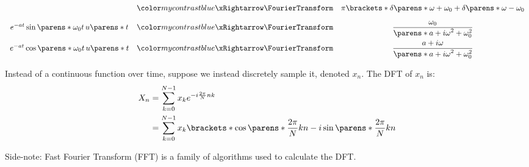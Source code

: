 \begin{multicols}{2}
\begin{CheatsheetEntryFrame}
\begin{equation*}
\begin{array}{ccc}
                &\TmpFTArrow&
                \pi \brackets*{
                    \delta\parens*{\omega + \omega_0}
                    + \delta\parens*{\omega - \omega_0}
                }
                \\[1em]
                e^{-a t} \sin\parens*{\omega_0 t} \, u\parens*{t}
                &\TmpFTArrow&
                \displaystyle
                \frac{\omega_0}{\parens*{a + i \omega}^2 + \omega_0^2}
                \\[1em]
                e^{-a t} \cos\parens*{\omega_0 t} \, u\parens*{t}
                &\TmpFTArrow&
                \displaystyle
                \frac{a + i \omega}{\parens*{a + i \omega}^2 + \omega_0^2}
            \end{array}
        \end{equation*}

    \end{CheatsheetEntryFrame}
    
\end{multicols}
\newpage
\begin{multicols}{2}

    \begin{CheatsheetEntryFrame}


        Instead of a continuous function over time, suppose we instead discretely sample it, denoted $x_n$. The DFT of $x_n$ is:
        \begin{align*}
            X_n
            &= \sum_{k=0}^{N-1} x_k e^{-i \frac{2 \pi}{N} n k}
            \\
            &= \sum_{k=0}^{N-1} x_k \brackets*{
                \cos\parens*{\frac{2 \pi}{N} k n}
                - i \sin\parens*{\frac{2 \pi}{N} k n}
            }
        \end{align*}

        {\footnotesize
            Side-note: Fast Fourier Transform (FFT) is a family of algorithms used to calculate the DFT.
        }


    \end{CheatsheetEntryFrame}
    
\end{multicols}
\newpage

